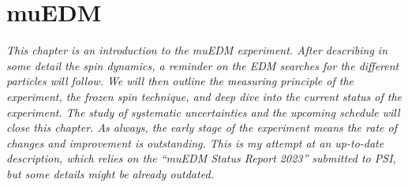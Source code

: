 \chapter{muEDM}
\label{ch:muEDM}
\begin{refsection}

{\itshape
This chapter is an introduction to the muEDM experiment. After describing in some detail the spin dynamics, a reminder on the EDM searches for the different particles will follow.
We will then outline the measuring principle of the experiment, the frozen spin technique, and deep dive into the current status of the experiment. 
The study of systematic uncertainties and the upcoming schedule will close this chapter. 
As always, the early stage of the experiment means the rate of changes and improvement is outstanding. 
This is my attempt at an up-to-date description, which relies on the ``muEDM Status Report 2023'' submitted to PSI, but some details might be already outdated.}

\cite{muEDM:Semertzidis:2001} \cite{muEDM:Adelmann:2010} \cite{muEDM:J-PARC:2011} \cite{muEDM:J-PARC:2016} \cite{muEDM:PSI:2021} \cite{muEDM:PSI:Mikio:2022} \cite{muEDM:PSI:Kim:2022}


\end{refsection}
